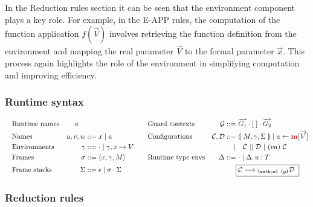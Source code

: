 \documentclass{l4proj}
\begin{document}
In the Reduction rules section it can be seen that the environment component plays a key role. For example, in the E-APP rules, the computation of the function application $f(\overrightarrow V)$ involves retrieving the function definition from the environment and mapping the real parameter $\overrightarrow V$ to the formal parameter $\overrightarrow x$. This process again highlights the role of the environment in simplifying computation and improving efficiency.

\subsubsection{Runtime syntax}

\begin{align*}
 \quad &\text{Runtime names} & a \quad & && \text{Guard contexts} \quad & \mathcal{G} ::=& \ \overrightarrow{G_1} \cdot [ \; ] \cdot \overrightarrow{G_2} \\
 \quad &\text{Names}        & u, v, w  & ::= x \mid a && \text{Configurations} & \mathcal{C}, \mathcal{D} ::=& \ \llparenthesis \ M, \gamma, \Sigma \ \rrparenthesis \mid a \leftarrow \textcolor{red!80!black}{\textbf{m}} [\overrightarrow{V}] \\
 \quad &\text{Environments} & \gamma  & ::=  \cdot \mid \gamma, x \mapsto V \quad  &&& \mid & \quad \mathcal{C} \ || \ \mathcal{D} \ | \ (va) \ \mathcal{C} \\
 \quad &\text{Frames}       & \sigma  & ::=  \langle x,\gamma, M \rangle && \text{Runtime type envs} & \Delta  ::=& \ \cdot \mid \Delta, u : T \\
 \quad &\text{Frame stacks} & \Sigma  & ::= \epsilon \mid \sigma \cdot \Sigma &&&& \fbox{%
    $ \mathcal{C} \longrightarrow{} _\mathcal{p}\mathcal{D}$
}
\end{align*}
\vspace{-\baselineskip} 
\subsubsection{Reduction rules}
\end{document}

